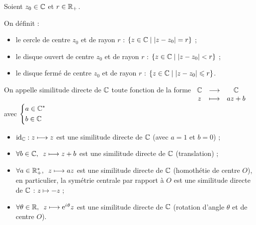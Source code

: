 \begin{defi}
Soient \(z_0\in\mathbb{C}\) et \(r\in\mathbb{R}_+\).

On définit : \begin{itemize}
\item le cercle de centre \(z_0\) et de rayon \(r\) : \(\left\lbrace z\in\mathbb{C}\;\middle|\;\left\lvert z-z_0\right\rvert=r\right\rbrace\) ;

\item le disque ouvert de centre \(z_0\) et de rayon \(r\) : \(\left\lbrace z\in\mathbb{C}\;\middle|\;\left\lvert z-z_0\right\rvert<r\right\rbrace\) ;

\item le disque fermé de centre \(z_0\) et de rayon \(r\) : \(\left\lbrace z\in\mathbb{C}\;\middle|\;\left\lvert z-z_0\right\rvert\leqslant r\right\rbrace\).
\end{itemize}
\end{defi}

\begin{defi}
On appelle similitude directe de \(\mathbb{C}\) toute fonction de la forme \(\begin{array}[t]{ccc}\mathbb{C} & \longrightarrow & \mathbb{C} \\ z & \longmapsto & az+b\end{array}\) avec \(\begin{dcases}a\in\mathbb{C}^* \\ b\in\mathbb{C}\end{dcases}\)
\end{defi}

\begin{ex}
\begin{itemize}
\item \(\mathrm{id}_{\mathbb{C}}:z\longmapsto z\) est une similitude directe de \(\mathbb{C}\) (avec \(a=1\) et \(b=0\)) ;

\item \(\quantifs{\forall b\in\C}z\mapsto z+b\) est une similitude directe de \(\mathbb{C}\) (translation) ;

\item \(\quantifs{\forall a\in\Rps}z\mapsto az\) est une similitude directe de \(\mathbb{C}\) (homothétie de centre \(O\)), en particulier, la symétrie centrale par rapport à \(O\) est une similitude directe de \(\mathbb{C}\) : \(z\mapsto-z\) ;

\item \(\quantifs{\forall\theta\in\R}z\mapsto\e{\i\theta}z\) est une similitude directe de \(\mathbb{C}\) (rotation d'angle \(\theta\) et de centre \(O\)).
\end{itemize}
\end{ex}


